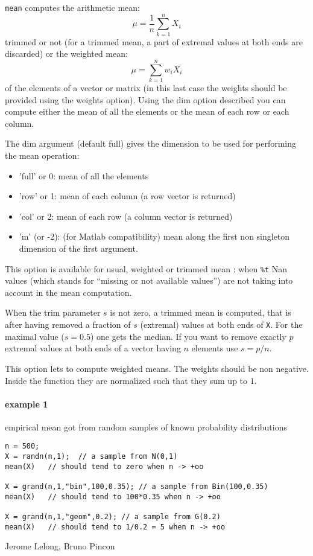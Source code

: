 \begin{mandescription}
  \verb+mean+ computes the arithmetic mean:
$$
    \mu = \frac{1}{n} \sum_{k=1}^n X_i 
$$ 
trimmed or not (for a trimmed mean, a part of extremal values at both ends are discarded) 
or the weighted mean:
$$
    \mu = \sum_{k=1}^n w_i X_i 
$$
of the elements of a vector or matrix (in this last case the weights should be provided
using the weights option). Using the dim option described you can compute either
the mean of all the elements or the mean of each row or each column. 

  The dim argument (default full) gives the dimension to be used for performing the mean operation:
  \begin{itemize}
    \item 'full' or 0: mean of all the elements 
    \item 'row' or 1: mean of each column (a row vector is returned)
    \item 'col' or 2: mean of each row (a column vector is returned)
    \item 'm' (or -2): (for Matlab compatibility) mean along the first non 
          singleton dimension of the first argument.
  \end{itemize}

   This option is available for usual, weighted or trimmed mean : when  \verb+%t+  Nan values 
  (which stands for ``missing or not available values'') are not taking into account in the
   mean computation.

  When the trim parameter $s$ is not zero, a trimmed mean is computed, that is
  after having removed a fraction of $s$ (extremal) values at both ends of \verb+X+. For
  the maximal value ($s=0.5$) one gets the median. If you want to remove exactly $p$
  extremal values at both ends of a vector having $n$ elements use $s = p/n$.  
   
  This option lets to compute weighted means. The weights should be non negative. Inside
the function they are normalized such that they sum up to $1$.

\end{mandescription}
\begin{examples}
\paragraph{example 1} empirical mean got from random samples of known probability distributions 
\begin{Verbatim}
n = 500;
X = randn(n,1);  // a sample from N(0,1)
mean(X)   // should tend to zero when n -> +oo

X = grand(n,1,"bin",100,0.35); // a sample from Bin(100,0.35)
mean(X)   // should tend to 100*0.35 when n -> +oo

X = grand(n,1,"geom",0.2); // a sample from G(0.2)
mean(X)   // should tend to 1/0.2 = 5 when n -> +oo
\end{Verbatim}

\end{examples}

\begin{manseealso}
\end{manseealso}

\begin{authors}
  Jerome Lelong, Bruno Pincon
\end{authors}
